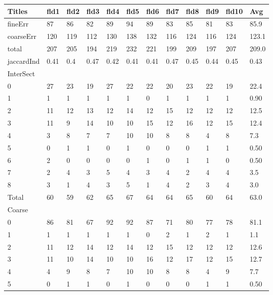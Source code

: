 \documentclass[ms]{nuthesis}
\begin{document}
\FloatBarrier
\begin{table}[h]
  \small
  \centering
  \begin{tabular}{|l||l||l||l||l||l||l||l||l||l||l||l|}\toprule
    Titles & fld1 & fld2 & fld3 & fld4 & fld5 & fld6 & fld7 & fld8 & fld9 & fld10 & Avg \\ \midrule
    fineErr & 87 & 86 & 82 & 89 & 94 & 89 & 83 & 85 & 81 & 83 & 85.9 \\
    coarseErr & 120 & 119 & 112 & 130 & 138 & 132 & 116 & 124 & 116 & 124 & 123.1 \\
    total & 207 & 205 & 194 & 219 & 232 & 221 & 199 & 209 & 197 & 207 & 209.0 \\
    jaccardInd & 0.41 & 0.4 & 0.47 & 0.42 & 0.41 & 0.41 & 0.47 & 0.45 & 0.44 & 0.45 & 0.43 \\
    InterSect &  &  &  &  &  &  &  &  &  &  &  \\
    0 & 27 & 23 & 19 & 27 & 22 & 22 & 20 & 23 & 22 & 19 & 22.4 \\
    1 & 1 & 1 & 1 & 1 & 1 & 0 & 1 & 1 & 1 & 1 & 0.90 \\
    2 & 11 & 12 & 13 & 12 & 14 & 12 & 15 & 12 & 12 & 12 & 12.5 \\
    3 & 11 & 9 & 14 & 10 & 10 & 15 & 12 & 16 & 12 & 15 & 12.4 \\
    4 & 3 & 8 & 7 & 7 & 10 & 10 & 8 & 8 & 4 & 8 & 7.3 \\
    5 & 0 & 1 & 1 & 0 & 1 & 0 & 0 & 0 & 1 & 1 & 0.50 \\
    6 & 2 & 0 & 0 & 0 & 0 & 1 & 0 & 1 & 1 & 0 & 0.50 \\
    7 & 2 & 4 & 3 & 5 & 4 & 3 & 4 & 2 & 4 & 4 & 3.5 \\
    8 & 3 & 1 & 4 & 3 & 5 & 1 & 4 & 2 & 3 & 4 & 3.0 \\
    Total & 60 & 59 & 62 & 65 & 67 & 64 & 64 & 65 & 60 & 64 & 63.0 \\
    Coarse &  &  &  &  &  &  &  &  &  &  &  \\
    0 & 86 & 81 & 67 & 92 & 92 & 87 & 71 & 80 & 77 & 78 & 81.1 \\
    1 & 1 & 1 & 1 & 1 & 1 & 0 & 2 & 1 & 2 & 1 & 1.1 \\
    2 & 11 & 12 & 14 & 12 & 14 & 12 & 15 & 12 & 12 & 12 & 12.6 \\
    3 & 11 & 10 & 14 & 10 & 10 & 16 & 12 & 17 & 12 & 15 & 12.7 \\
    4 & 4 & 9 & 8 & 7 & 10 & 10 & 8 & 8 & 4 & 9 & 7.7 \\
    5 & 0 & 1 & 1 & 0 & 1 & 0 & 0 & 0 & 1 & 1 & 0.50 \\

\end{tabular}
\end{table}
\end{document}
